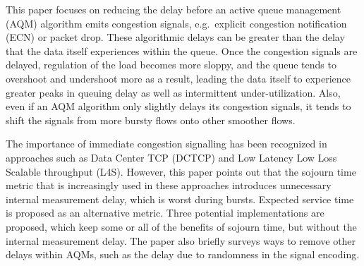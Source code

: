 This paper focuses on reducing the delay before an active queue management (AQM) algorithm emits congestion signals, e.g.\ explicit congestion notification (ECN) or packet drop. These algorithmic delays can be greater than the delay that the data itself experiences within the queue. Once the congestion signals are delayed, regulation of the load becomes more sloppy, and the queue tends to overshoot and undershoot more as a result, leading the data itself to experience greater peaks in queuing delay as well as intermittent under-utilization. Also, even if an AQM algorithm only slightly delays its congestion signals, it tends to shift the signals from more bursty flows onto other smoother flows.

The importance of immediate congestion signalling has been recognized in approaches such as Data Center TCP (DCTCP) and Low Latency Low Loss Scalable throughput (L4S). However, this paper points out that the sojourn time metric that is increasingly used in these approaches introduces unnecessary internal measurement delay, which is worst during bursts. Expected service time is proposed as an alternative metric. Three potential implementations are proposed, which keep some or all of the benefits of sojourn time, but without the internal measurement delay. The paper also briefly surveys ways to remove other delays within AQMs, such as the delay due to randomness in the signal encoding.



